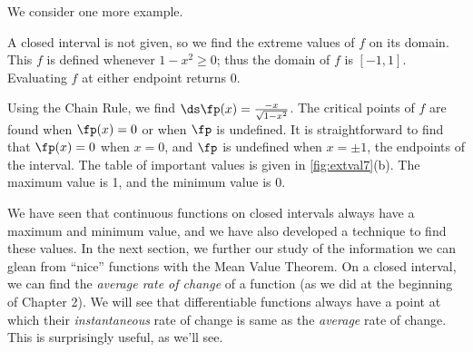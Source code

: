 We consider one more example.

{%
A closed interval is not given, so we find the extreme values of $f$ on its domain. This $f$ is defined whenever $1-x^2\geq 0$; thus the domain of $f$ is $[-1,1]$. Evaluating $f$ at either endpoint returns 0.

Using the Chain Rule, we find $\ds \fp(x) = \frac{-x}{\sqrt{1-x^2}}$. The critical points of $f$ are found when $\fp(x) = 0$ or when $\fp$ is undefined. It is straightforward to find that $\fp(x) = 0$ when $x=0$, and $\fp$ is undefined when $x=\pm 1$, the endpoints of the interval. The table of important values is given in \autoref{fig:extval7}(b). The maximum value is 1, and the minimum value is 0.}


We have seen that continuous functions on closed intervals always have a maximum and minimum value, and we have also developed a technique to find these values. In the next section, we further our study of the information we can glean from ``nice'' functions with the Mean Value Theorem. On a closed interval, we can find the \textit{average rate of change} of a function (as we did at the beginning of Chapter 2). We will see that differentiable functions always have a point at which their \textit{instantaneous} rate of change is same as the \textit{average} rate of change. This is surprisingly useful, as we'll see.

